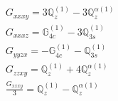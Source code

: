 \documentclass[fleqn,8pt,landscape]{jsarticle}
\begin{document}
\begin{align*}
& G_{xxxy} = 3 \mathbb{Q}_{z}^{(1)} - 3 \mathbb{Q}_{z}^{\alpha(1)} \\
& G_{xxxz} = \mathbb{G}_{4c}^{(1)} - 3 \mathbb{Q}_{3s}^{(1)} \\
& G_{yyzx} = - \mathbb{G}_{4c}^{(1)} - \mathbb{Q}_{3s}^{(1)} \\
& G_{zzxy} = \mathbb{Q}_{z}^{(1)} + 4 \mathbb{Q}_{z}^{\alpha(1)} \\
& \frac{G_{xxxy}}{3} = \mathbb{Q}_{z}^{(1)} - \mathbb{Q}_{z}^{\alpha(1)}
\end{align*}
\end{document}
